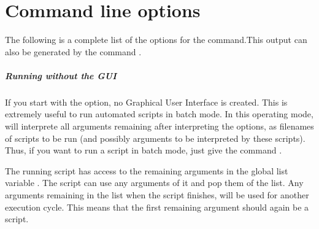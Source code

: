 

\chapter{Command line options}
\label{cha:commandline}

The following is a complete list of the options for the  command.This output can also be generated by the command .


\paragraph{Running \pyFormex without the GUI}
If you start \pyf with the  option, no Graphical User Interface is created. This is extremely useful to run automated scripts in batch mode. In this operating mode, \pyf will interprete all arguments remaining after interpreting the options, as filenames of scripts to be run (and possibly arguments to be interpreted by these scripts).
Thus, if you want to run a \pyf script  in batch mode, just give the command .

The running script has access to the remaining arguments in the global list variable . The script can use any arguments of it and pop them of the list. Any arguments remaining in the  list when the script finishes, will be used for another \pyf execution cycle. This means that the first remaining argument should again be a \pyf script.
 
\endinput

